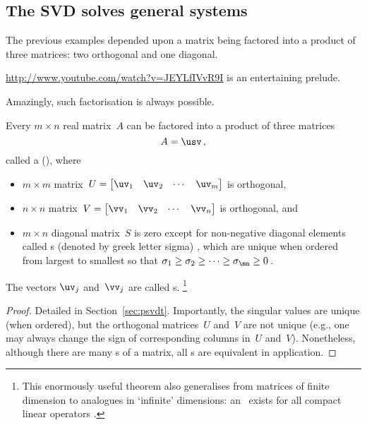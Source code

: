 \subsection{The SVD solves general systems}
\label{sec:svdsgs}

The previous examples depended upon a matrix being factored into a product of three matrices: two orthogonal and one diagonal.
\begin{aside}\url{http://www.youtube.com/watch?v=JEYLfIVvR9I} is an entertaining prelude.\end{aside}%
Amazingly, such factorisation is always possible.

\begin{theorem} \label{thm:svd} 
    Every $m\times n$ real matrix~$A$ can be factored into a product of three matrices
    \begin{equation}
        A=\usv\,,
    \end{equation}
    called a  (\svd), where
    \begin{itemize}
		\item $m\times m$ matrix~$U=\begin{bmatrix} \uv _1 &\uv_2&\cdots&\uv _m \end{bmatrix}$ is orthogonal, 
		\item $n\times n$ matrix~$V=\begin{bmatrix} \vv_1 &\vv_2&\cdots&\vv_n \end{bmatrix}$ is orthogonal, and      
        \item  $m\times n$ diagonal matrix~$S$ is zero except for non-negative diagonal elements called s (denoted by greek letter sigma) \hlist\sigma\mn, which are unique when ordered from largest to smallest so that $\sigma_1\geq \sigma_2 \geq \cdots \geq \sigma_{\mn}\geq 0$\,.
    \end{itemize}
    The  vectors \(\uv_j\) and~\(\vv_j\) are called s.
    \footnote{This enormously useful theorem also generalises from matrices of finite dimension to analogues in `infinite' dimensions: an \svd\ exists for all compact linear operators \cite[\S7]{Kress2015}.}
\end{theorem}

\begin{proof}
Detailed in Section~\ref{sec:psvdt}.
Importantly, the singular values are unique (when ordered), but the orthogonal matrices~\(U\) and~\(V\) are not unique (e.g., one may always change the sign of corresponding columns in~\(U\) and~\(V\)).
Nonetheless, although there are many \svd{}s of a matrix, all \svd{}s are equivalent in application.
\end{proof}

